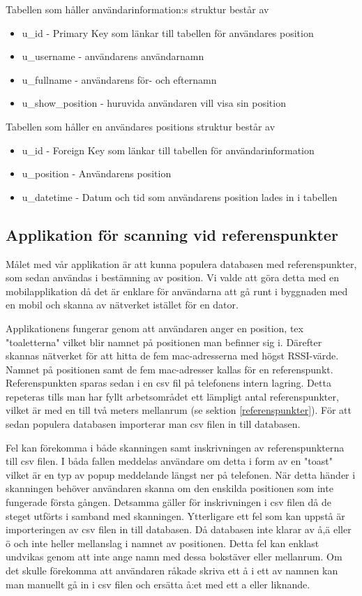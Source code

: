 \documentclass[swedish, a4paper,12pt]{article}
\begin{document}
Tabellen som håller användarinformation:s struktur består av
\begin{itemize}
  \item  u\_id - Primary Key som länkar till tabellen för användares position
  \item  u\_username - användarens användarnamn
  \item  u\_fullname - användarens för- och efternamn
  \item  u\_show\_position - huruvida användaren vill visa sin position
\end{itemize}

Tabellen som håller en användares positions struktur består av
\begin{itemize}
  \item u\_id - Foreign Key som länkar till tabellen för användarinformation
  \item u\_position - Användarens position
  \item u\_datetime - Datum och tid som användarens position lades in i tabellen
\end{itemize}


\subsection{Applikation för scanning vid referenspunkter}
Målet med vår applikation är att kunna populera databasen med referenspunkter, som sedan användas i bestämning av position. Vi valde att göra detta med en mobilapplikation då det är enklare för användarna att gå runt i byggnaden med en mobil och skanna av nätverket istället för en dator.

Applikationens fungerar genom att användaren anger en position, tex "toaletterna" vilket blir namnet på positionen man befinner sig i. Därefter skannas nätverket för att hitta de fem mac-adresserna med högst RSSI-värde. Namnet på positionen samt de fem mac-adresser kallas för en referenspunkt. Referenspunkten sparas sedan i en csv fil på telefonens intern lagring. Detta repeteras tills man har fyllt arbetsområdet ett lämpligt antal referenspunkter, vilket är med en till två meters mellanrum (se sektion \ref{referenspunkter}). För att sedan populera databasen importerar man csv filen in till databasen.

Fel kan förekomma i både skanningen samt inskrivningen av referenspunkterna till csv filen. I båda fallen meddelas användare om detta i form av en "toast" vilket är en typ av popup meddelande längst ner på telefonen. När detta händer i skanningen behöver användaren skanna om den enskilda positionen som inte fungerade första gången. Detsamma gäller för inskrivningen i csv filen då de steget utförts i samband med skanningen. Ytterligare ett fel som kan uppstå är importeringen av csv filen in till databasen. Då databasen inte klarar av å,ä eller ö och inte heller mellanslag i namnet av positionen. Detta fel kan enklast undvikas genom att inte ange namn med dessa bokstäver eller mellanrum. Om det skulle förekomma att användaren råkade skriva ett å i ett av namnen kan man manuellt gå in i csv filen och ersätta å:et med ett a eller liknande.
\end{document}
